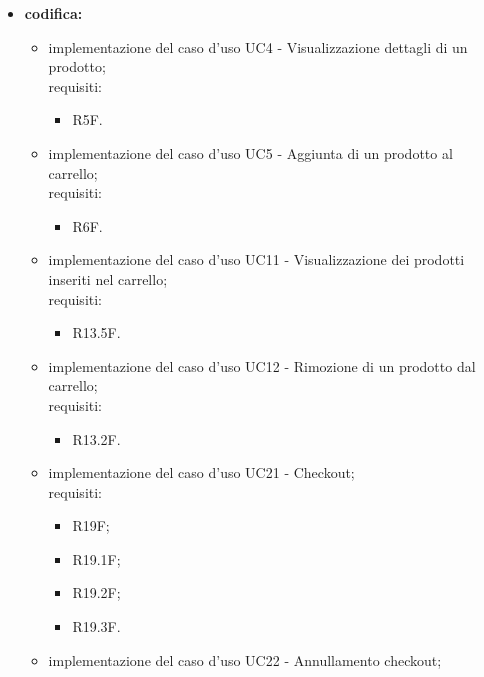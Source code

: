 \begin{itemize}
    \item \textbf{codifica:}
          \begin{itemize}
              \item implementazione del caso d'uso UC4 - Visualizzazione dettagli di un prodotto;\\
                    requisiti:
                    \begin{itemize}
                        \item R5F.
                    \end{itemize}
              \item implementazione del caso d'uso UC5 - Aggiunta di un prodotto al carrello;\\
                    requisiti:
                    \begin{itemize}
                        \item R6F.
                    \end{itemize}
              \item implementazione del caso d'uso UC11 - Visualizzazione dei prodotti inseriti nel carrello;\\
                    requisiti:
                    \begin{itemize}
                        \item R13.5F.
                    \end{itemize}
              \item implementazione del caso d'uso UC12 - Rimozione di un prodotto dal carrello;\\
                    requisiti:
                    \begin{itemize}
                        \item R13.2F.
                    \end{itemize}
              \item implementazione del caso d'uso UC21 - Checkout;\\
                    requisiti:
                    \begin{itemize}
                        \item R19F;
                        \item R19.1F;
                        \item R19.2F;
                        \item R19.3F.
                    \end{itemize}
              \item implementazione del caso d'uso UC22 -  Annullamento checkout;\\

\end{itemize}
\end{itemize}

